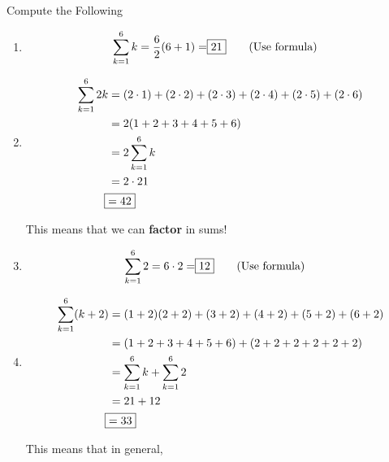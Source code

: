 \documentclass[../../Main.tex]{subfiles}
\begin{document}
\begin{example}
    Compute the Following

    \begin{enumerate}
        \item 
            \begin{align*}
                \sum_{k = 1}^{6} k = \frac{6}{2}(6 + 1) = \Aboxed{21} \tag{Use formula}
            \end{align*}

        \item 
            \begin{align*}
                \sum_{k = 1}^{6} 2k &= (2 \cdot 1) + (2 \cdot 2) + (2 \cdot 3) + (2 \cdot 4) + (2 \cdot 5) + (2 \cdot 6) \\
                &= 2(1 + 2 + 3 + 4 + 5 + 6) \\
                &= 2 \sum_{k = 1}^{6} k \\
                &= 2 \cdot 21 \\
                \Aboxed{&= 42} \\
            \end{align*}

        \begin{note}
            This means that we can \textbf{factor} in sums!
        \end{note}

        \item 
            \begin{align*}
                \sum_{k = 1}^{6} 2 = 6 \cdot 2 = \Aboxed{12} \tag{Use formula}
            \end{align*}

        \item 
            \begin{align*}
                \sum_{k = 1}^{6} (k + 2) &= (1 + 2) (2 + 2) + (3 + 2) + (4 + 2) + (5 + 2) + (6 + 2) \\
                &= (1 + 2 + 3 + 4 + 5 + 6) + (2 + 2 + 2 + 2 + 2 + 2) \\
                &= \sum_{k = 1}^{6} k + \sum_{k = 1}^{6} 2 \\
                &= 21 + 12 \\
                \Aboxed{&= 33} \\
            \end{align*}

        \begin{note}
            This means that in general,


\end{note}
\end{enumerate}
\end{example}
\end{document}
